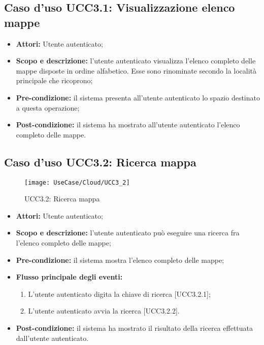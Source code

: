 \subsection{Caso d'uso UCC3.1: Visualizzazione elenco mappe}

\begin{itemize}
\item \textbf{Attori:} Utente autenticato;
\item \textbf{Scopo e descrizione:} l'utente autenticato visualizza l'elenco completo delle mappe disposte in ordine alfabetico. Esse sono rinominate secondo la località principale che ricoprono;
\item \textbf{Pre-condizione:} il sistema presenta all'utente autenticato lo spazio destinato a questa operazione;
\item \textbf{Post-condizione:} il sistema ha mostrato all'utente autenticato l'elenco completo delle mappe.
\end{itemize}

\subsection{Caso d'uso UCC3.2: Ricerca mappa}

\begin{figure}[H]
\centering
\texttt{[image: UseCase/Cloud/UCC3\_2]}
\caption{UCC3.2: Ricerca mappa}
\end{figure}

\begin{itemize}
\item \textbf{Attori:} Utente autenticato;
\item \textbf{Scopo e descrizione:} l'utente autenticato può eseguire una ricerca fra l'elenco completo delle mappe;
\item \textbf{Pre-condizione:} il sistema mostra l'elenco completo delle mappe;
\item \textbf{Flusso principale degli eventi:}
\begin{enumerate}
\item L'utente autenticato digita la chiave di ricerca [UCC3.2.1];
\item L'utente autenticato avvia la ricerca [UCC3.2.2].
\end{enumerate}
\item \textbf{Post-condizione:} il sistema ha mostrato il risultato della ricerca effettuata dall'utente autenticato. 
\end{itemize}

